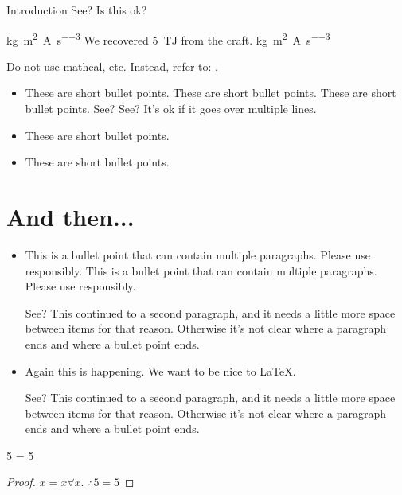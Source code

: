 \begin{MainChapter}{Introduction}
See? Is this ok?

\unit{\kilogram \meter \squared \per \ampere \per \second \cubed}
We recovered \qty{5}{\tera\joule} from the craft.
\unit{\kilogram \meter \squared \per \ampere \per \second \cubed}

Do not use mathcal, etc. Instead, refer to: .

\begin{itemize}
    \item These are short bullet points. These are short bullet points. These are short bullet points. See? See? It's ok if it goes over multiple lines.
    \item These are short bullet points.
    \item These are short bullet points.
\end{itemize}

\newpage
\section{And then...}

\begin{itemize}[long]
    \item
    This is a bullet point that can contain multiple paragraphs. Please use responsibly.
    This is a bullet point that can contain multiple paragraphs. Please use responsibly.
    
    See? This continued to a second paragraph, and it needs a little more space between items for that reason. Otherwise it's not clear where a paragraph ends and where a bullet point ends.
    
    \item Again this is happening. We want to be nice to LaTeX.
    
    See? This continued to a second paragraph, and it needs a little more space between items for that reason. Otherwise it's not clear where a paragraph ends and where a bullet point ends.
\end{itemize}

\begin{Theorem}[label=mythm, name=Fiveness]
5 = 5
\end{Theorem}

\begin{proof}
$x = x \forall x$. $\therefore 5 = 5$
\end{proof}



\end{MainChapter}

